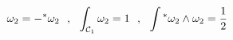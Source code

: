 \begin{equation}
\omega_2 = - {}^{*} \omega_2~~,~~ \int_{{\cal C}_1} \omega_2 = 1~~,~~
\int {}^* \omega_2 \wedge \omega_2 = \frac{1}{2}
\label{omega289}
\end{equation}

